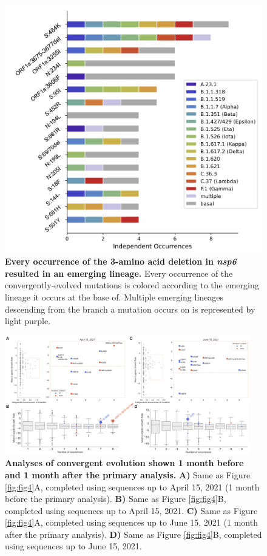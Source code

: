 \documentclass[11pt,oneside,letterpaper]{article}
\begin{document}
\begin{figure}[h!]
	\centerline{\includegraphics[scale=0.55]{fig4_supp1.png}}
	\caption{\textbf{Every occurrence of the 3-amino acid deletion in \emph{nsp6} resulted in an emerging lineage.}
	Every occurrence of the convergently-evolved mutations is colored according to the emerging lineage it occurs at the base of. Multiple emerging lineages descending from the branch a mutation occurs on is represented by light purple.
	}
	\label{fig:fig4_supp1}
\end{figure}

\begin{figure}[h!]
	\centerline{\includegraphics[width=0.95\textwidth]{fig4_supp2.png}}
	\caption{\textbf{Analyses of convergent evolution shown 1 month before and 1 month after the primary analysis.}
	\textbf{A)} Same as Figure \ref{fig:fig4}A, completed using sequences up to April 15, 2021 (1 month before the primary analysis). \textbf{B)} Same as Figure \ref{fig:fig4}B, completed using sequences up to April 15, 2021. \textbf{C)} Same as Figure \ref{fig:fig4}A, completed using sequences up to June 15, 2021 (1 month after the primary analysis). \textbf{D)} Same as Figure \ref{fig:fig4}B, completed using sequences up to June 15, 2021.
	}
	\label{fig:fig4_supp2}
\end{figure}
\end{document}
